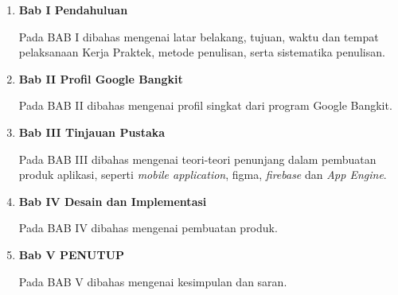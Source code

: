 \begin{enumerate}[nolistsep]

      \item \textbf{Bab I Pendahuluan}
            \vspace{0.5ex}

            Pada BAB I dibahas mengenai latar belakang, tujuan, waktu dan tempat
            pelaksanaan Kerja Praktek, metode penulisan, serta sistematika penulisan.
            \vspace{0.5ex}

      \item \textbf{Bab II Profil Google Bangkit}
            \vspace{0.5ex}

            Pada BAB II dibahas mengenai profil singkat dari program Google Bangkit.
            \vspace{0.5ex}

      \item \textbf{Bab III Tinjauan Pustaka}
            \vspace{0.5ex}

            Pada BAB III dibahas mengenai teori-teori penunjang dalam pembuatan produk aplikasi,
            seperti \textit{mobile application}, figma, \textit{firebase} dan \textit{App Engine}.
            \vspace{0.5ex}

      \item \textbf{Bab IV Desain dan Implementasi}
            \vspace{0.5ex}

            Pada BAB IV dibahas mengenai pembuatan produk.

            \vspace{0.5ex}

      \item \textbf{Bab V PENUTUP}
            \vspace{0.5ex}

            Pada BAB V dibahas mengenai kesimpulan dan saran.
            \vspace{0.5ex}

\end{enumerate}